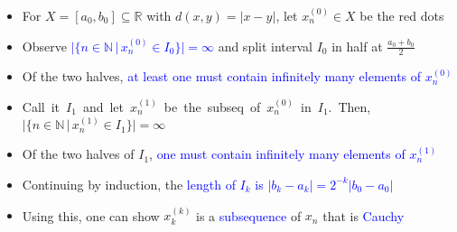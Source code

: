\documentclass[10pt,english,aspectratio=169]{beamer}
\begin{document}
\begin{frame}
\vspace{-3mm}

\begin{itemize}
\setlength{\itemsep}{1.25mm}
\item<1-> For $X = [a_0,b_0] \subseteq \mathbb{R}$ with $d(x,y) = |x-y|$, let $x_n^{(0)} \in X$ be the red dots$\!\!\!\!\!\!\!\!\!$
\item<2-> Observe \textcolor{blue}{$|\{n\in \mathbb{N} \, |\, x_{n}^{(0)} \in I_0 \} | = \infty$} and split interval $I_0$ in half at $\frac{a_0+b_0}{2}$
\item<3-> Of the two halves, \textcolor{blue}{at least one must contain infinitely many elements of $x_n^{(0)}\!\!\!\!\!\!$}
\item<4-> \mbox{Call it $I_1$ and let $x_{n}^{(1)}$ be the subseq of $x_n^{(0)}$ in $I_1$. Then, $|\{n\in \mathbb{N} \, |\, x^{(1)}_{n} \in I_1 \} | = \infty\!\!\!\!\!\!\!\!\!\!\!\!\!\!\!\!\!\!\!\!\!\!\!\!\!\!\!$}
\item<5-> Of the two halves of $I_1$, \textcolor{blue}{one must contain infinitely many elements of $x_n^{(1)}$}
\item<6-> Continuing by induction, the \textcolor{blue}{length of $I_k$ is $|b_k-a_k| = 2^{-k}| b_0-a_0 |$}
\item<7-> Using this, one can show $x^{(k)}_k$ is a  \textcolor{blue}{subsequence} of $x_n$ that is \textcolor{blue}{Cauchy}
\end{itemize}


\end{frame}
\end{document}
